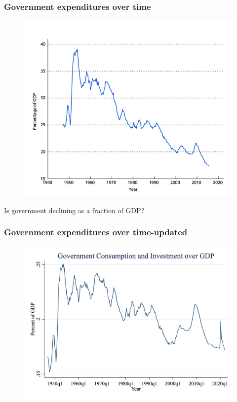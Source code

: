 \documentclass{beamer}
\begin{document}
\begin{frame}
\frametitle[alignment=center]{Government expenditures over time}
\begin{figure}
\centering
\includegraphics[scale=0.5]{Figures/W_Fig_5pt12.png}
\end{figure}
Is government declining as a fraction of GDP?
\end{frame}

\begin{frame}
\frametitle[alignment=center]{Government expenditures over time-updated}
\begin{figure}
\centering
\includegraphics[scale=0.2]{Figures/GoverY_1.png}
\end{figure}
\end{frame}
\end{document}
